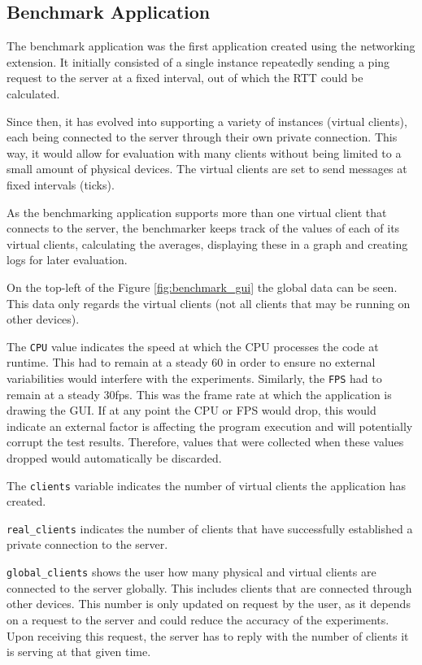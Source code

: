 \documentclass[bsc, 12pt, twoside, singlespacing, parskip, abbrevs, notimes, normalheadings, logo]{styles/infthesis}
\begin{document}
\subsection{Benchmark Application}
The benchmark application was the first application created using the networking extension. It initially consisted of a single instance repeatedly sending a ping request to the server at a fixed interval, out of which the RTT could be calculated.

Since then, it has evolved into supporting a variety of instances (virtual clients), each being connected to the server through their own private connection. This way, it would allow for evaluation with many clients without being limited to a small amount of physical devices. The virtual clients are set to send messages at fixed intervals (ticks).

As the benchmarking application supports more than one virtual client that connects to the server, the benchmarker keeps track of the values of each of its virtual clients, calculating the averages, displaying these in a graph and creating logs for later evaluation.

On the top-left of the Figure \ref{fig:benchmark_gui} the global data can be seen. This data only regards the virtual clients (not all clients that may be running on other devices). 

The \texttt{CPU} value indicates the speed at which the CPU processes the code at runtime. This had to remain at a steady 60 in order to ensure no external variabilities would interfere with the experiments. Similarly, the \texttt{FPS} had to remain at a steady 30fps. This was the frame rate at which the application is drawing the GUI. If at any point the CPU or FPS would drop, this would indicate an external factor is affecting the program execution and will potentially corrupt the test results. Therefore, values that were collected when these values dropped would automatically be discarded.

The \texttt{clients} variable indicates the number of virtual clients the application has created. 

\texttt{real\_clients} indicates the number of clients that have successfully established a private connection to the server.

\texttt{global\_clients} shows the user how many physical and virtual clients are connected to the server globally. This includes clients that are connected through other devices. This number is only updated on request by the user, as it depends on a request to the server and could reduce the accuracy of the experiments. Upon receiving this request, the server has to reply with the number of clients it is serving at that given time.
\end{document}
